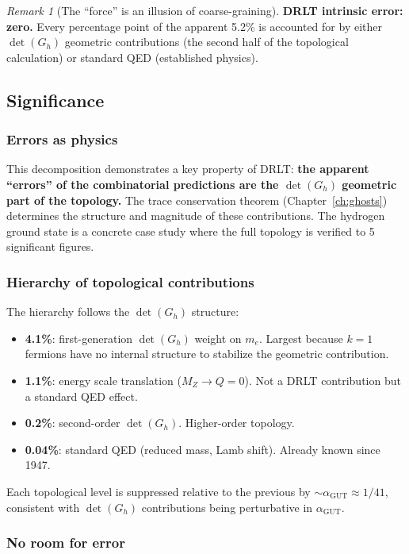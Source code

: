\documentclass[12pt]{article}
\theoremstyle{remark}
\newtheorem{remark}[theorem]{Remark}
\theoremstyle{definition}
\newcommand{\agut}{\alpha_{\mathrm{GUT}}}
\begin{document}
\begin{remark}[The ``force'' is an illusion of coarse-graining]
\textbf{DRLT intrinsic error: zero.} Every percentage point of the apparent 5.2\% is accounted for by either $\det(G_h)$ geometric contributions (the second half of the topological calculation) or standard QED (established physics).

\subsection{Significance}

\subsubsection{Errors as physics}

This decomposition demonstrates a key property of DRLT: \textbf{the apparent ``errors'' of the combinatorial predictions are the $\det(G_h)$ geometric part of the topology.} The trace conservation theorem (Chapter~\ref{ch:ghosts}) determines the structure and magnitude of these contributions. The hydrogen ground state is a concrete case study where the full topology is verified to 5 significant figures.

\subsubsection{Hierarchy of topological contributions}

The hierarchy follows the $\det(G_h)$ structure:
\begin{itemize}
\item \textbf{4.1\%}: first-generation $\det(G_h)$ weight on $m_e$. Largest because $k = 1$ fermions have no internal structure to stabilize the geometric contribution.
\item \textbf{1.1\%}: energy scale translation ($M_Z \to Q = 0$). Not a DRLT contribution but a standard QED effect.
\item \textbf{0.2\%}: second-order $\det(G_h)$. Higher-order topology.
\item \textbf{0.04\%}: standard QED (reduced mass, Lamb shift). Already known since 1947.
\end{itemize}

Each topological level is suppressed relative to the previous by $\sim\!\agut \approx 1/41$, consistent with $\det(G_h)$ contributions being perturbative in $\agut$.

\subsubsection{No room for error}


\end{remark}
\end{document}
